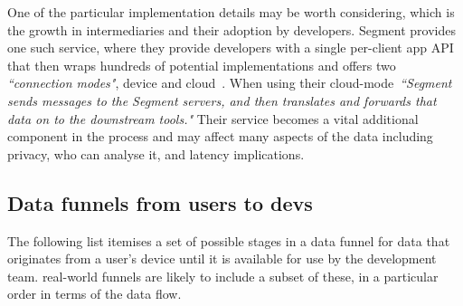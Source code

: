 One of the particular implementation details may be worth considering, which is the growth in intermediaries and their adoption by developers. Segment provides one such service, where they provide developers with a single per-client app API that then wraps hundreds of potential implementations and offers two \emph{``connection modes"}, device and cloud~. When using their cloud-mode~\emph{``Segment sends messages to the Segment servers, and then translates and forwards that data on to the downstream tools."} Their service becomes a vital additional component in the process and may affect many aspects of the data including privacy, who can analyse it, and latency implications.   

\subsection{Data funnels from users to devs}
The following list itemises a set of possible stages in a data funnel for data that originates from a user's device until it is available for use by the development team. real-world funnels are likely to include a subset of these, in a particular order in terms of the data flow.

